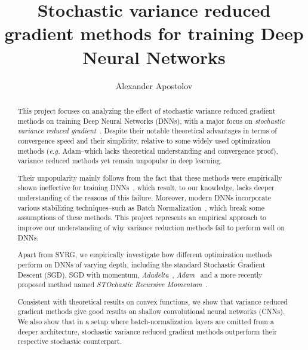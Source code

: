 \documentclass[a4paper,11pt,oneside]{report}
\title{Stochastic variance reduced gradient methods for training Deep Neural Networks}
\author{Alexander Apostolov}
\begin{document}
\maketitle

\begin{abstract}

This project focuses on analyzing the effect of stochastic variance reduced gradient methods on training Deep Neural Networks (DNNs), with a major focus on \textit{stochastic variance reduced gradient}~\citep[SVRG,][]{johnson2013svrg}. 
Despite their notable theoretical advantages in terms of convergence speed and their simplicity, relative to some widely used optimization methods (\textit{e.g.} Adam--which lacks theoretical understanding and convergence proof), variance reduced methods yet remain unpopular in deep learning. 

Their unpopularity mainly follows from the fact that these methods were empirically shown ineffective for training DNNs~\citep{Defazio2019}, which result, to our knowledge, lacks deeper understanding of the reasons of this failure.
Moreover, modern DNNs incorporate various stabilizing techniques--such as Batch Normalization~\citep{ioffe2015batch},  which break some assumptions of these methods. This project represents an empirical approach to improve our understanding of why variance reduction methods fail to  perform well on DNNs.



Apart from SVRG, we empirically investigate how different optimization methods perform on DNNs of varying depth, including the standard Stochastic Gradient Descent (SGD), SGD with momentum, \textit{Adadelta}~\citep{adadelta}, \textit{Adam}~\citep{kingma2014adam} and a more recently proposed method named \textit{STOchastic
Recursive Momentum}~\citep[STORM, ][]{Cutkosky2019storm}. 


 Consistent with theoretical results on convex functions, we show that variance reduced gradient methods give good results on shallow convolutional neural networks (CNNs). %
 We also show that in a setup where batch-normalization layers are omitted from a deeper architecture, stochastic variance reduced gradient methods outperform their respective stochastic counterpart. 

\end{abstract}
\end{document}
